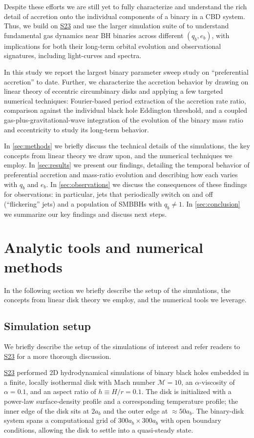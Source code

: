 \documentclass[fleqn,usenatbib]{mnras}
\newcommand{\Stwentythree}{\href{https://doi.org/10.1093/mnras/stac3263}{S23}\xspace}
\begin{document}
Despite these efforts we are still yet to fully characterize and understand the rich detail of accretion onto the individual components of a binary in a CBD system. Thus, we build on \Stwentythree and use the larger simulation suite of \citealt{siwek_cbdorbevol} to understand fundamental gas dynamics near BH binaries across different $(q_b, e_b)$, with implications for both their long-term orbital evolution and observational signatures, including light-curves and spectra.

In this study we report the largest binary parameter sweep study on ``preferential accretion'' to date. Further, we characterize the accretion behavior by drawing on linear theory of eccentric circumbinary disks and applying a few targeted numerical techniques: Fourier-based period extraction of the accretion rate ratio, comparison against the individual black hole Eddington threshold, and a coupled gas-plus-gravitational-wave integration of the evolution of the binary mass ratio and eccentricity to study its long-term behavior.

In \autoref{sec:methods} we briefly discuss the technical details of the simulations, the key concepts from linear theory we draw upon, and the numerical techniques we employ. In \autoref{sec:results} we present our findings, detailing the temporal behavior of preferential accretion and mass-ratio evolution and describing how each varies with $q_b$ and $e_b$. In \autoref{sec:observations} we discuss the consequences of these findings for observations: in particular, jets that periodically switch on and off (``flickering'' jets) and a population of SMBBHs with $q_b \neq 1$. In \autoref{sec:conclusion} we summarize our key findings and discuss next steps.


\section{Analytic tools and numerical methods}\label{sec:methods}
In the following section we briefly describe the setup of the \citet{siwek_prefacc, siwek_cbdorbevol} simulations, the concepts from linear disk theory we employ, and the numerical tools we leverage.
\subsection{Simulation setup}
We briefly describe the setup of the simulations of interest and refer readers to \Stwentythree for a more thorough discussion.

\Stwentythree performed 2D hydrodynamical simulations of binary black holes embedded in a finite, locally isothermal disk with Mach number $\mathcal{M}=10$, an $\alpha$-viscosity of $\alpha=0.1$, and an aspect ratio of $h\equiv H/r=0.1$. The disk is initialized with a power-law surface-density profile and a corresponding temperature profile; the inner edge of the disk sits at $2a_b$ and the outer edge at $\approx 50a_b$. The binary-disk system spans a computational grid of $300 a_b \times 300a_b$ with open boundary conditions, allowing the disk to settle into a quasi-steady state.
\end{document}
